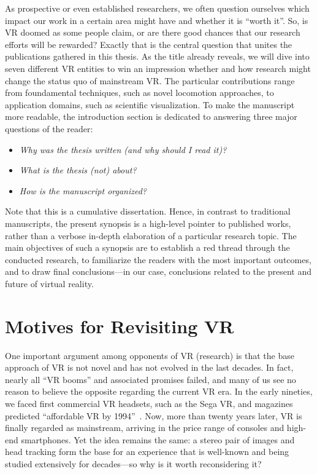 As prospective or even established researchers, we often question ourselves which impact our work in a certain area might have and whether it is ``worth it''. So, is VR doomed as some people claim, or are there good chances that our research efforts will be rewarded? Exactly that is the central question that unites the publications gathered in this thesis. As the title already reveals, we will dive into seven different VR entities to win an impression whether and how research might change the status quo of mainstream VR. The particular contributions range from foundamental techniques, such as novel locomotion approaches, to application domains, such as scientific visualization. To make the manuscript more readable, the introduction section is dedicated to answering three major questions of the reader: 
\begin{itemize}[noitemsep]
\item \textit{Why was the thesis written (and why should I read it)?}
\item \textit{What is the thesis (not) about?}
\item \textit{How is the manuscript organized?}
\end{itemize}
Note that this is a cumulative dissertation. Hence, in contrast to traditional manuscripts, the present synopsis is a high-level pointer to published works, rather than a verbose in-depth elaboration of a particular research topic. The main objectives of such a synopsis are to establish a red thread through the conducted research, to familiarize the readers with the most important outcomes, and to draw final conclusions---in our case, conclusions related to the present and future of virtual reality.








\section{Motives for Revisiting VR}

One important argument among opponents of VR (research) is that the base approach of VR is not novel and has not evolved in the last decades. In fact, nearly all ``VR booms'' and associated promises failed, and many of us see no reason to believe the opposite regarding the current VR era. In the early nineties, we faced first commercial VR headsets, such as the Sega VR, and magazines predicted ``affordable VR by 1994''~\cite{engler1992affordable}. Now, more than twenty years later, VR is finally regarded as mainstream, arriving in the price range of consoles and high-end smartphones. Yet the idea remains the same: a stereo pair of images and head tracking form the base for an experience that is well-known and being studied extensively for decades---so why is it worth reconsidering it? 


